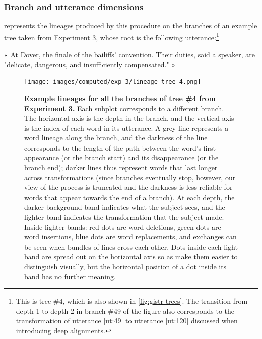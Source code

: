 \subsubsection{Branch and utterance
dimensions}\label{branch-and-utterance-dimensions}

 represents the lineages produced by this
procedure on the branches of an example tree taken from Experiment 3,
whose root is the following utterance:\footnote{This is tree \#4, which
  is also shown in \cref{fig:gistr-trees}. The transition from depth 1
  to depth 2 in branch \#49 of the figure also corresponds to the
  transformation of utterance \ref{ut:49} to utterance \ref{ut:120}
  discussed when introducing deep alignments.}

\begin{nquote} %
  « At Dover, the finale of the bailiffs' convention. Their duties, said a speaker, are "delicate, dangerous, and insufficiently compensated." »
\end{nquote}

\begin{figure}[!h]
  \centering
  \texttt{[image: images/computed/exp\_3/lineage-tree-4.png]}
  \caption[Example lineages for all the branches of tree \#4 from Experiment 3]{
  \textbf{Example lineages for all the branches of tree \#4 from Experiment 3.}
  Each subplot corresponds to a different branch.
  The horizontal axis is the depth in the branch, and the vertical axis is the index of each word in its utterance.
  A grey line represents a word lineage along the branch, and the darkness of the line corresponds to the length of the path between the word's first appearance (or the branch start) and its disappearance (or the branch end);
  darker lines thus represent words that last longer across transformations (since branches eventually stop, however, our view of the process is truncated and the darkness is less reliable for words that appear towards the end of a branch).
  At each depth, the darker background band indicates what the subject sees, and the lighter band indicates the transformation that the subject made.
  Inside lighter bands:
  red dots are word deletions, green dots are word insertions, blue dots are word replacements, and exchanges can be seen when bundles of lines cross each other.
  Dots inside each light band are spread out on the horizontal axis so as make them easier to distinguish visually, but the horizontal position of a dot inside its band has no further meaning.
  }
  \label{fig:gistr-lineage-tree}
\end{figure}

